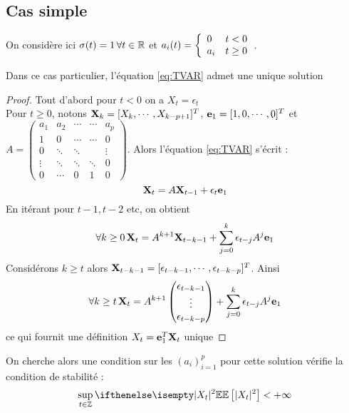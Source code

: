 \documentclass[a4paper,french]{article}
\begin{document}
\subsection{Cas simple}
On considère ici $\sigma(t)=1 \, \forall t\in \mathbb{R}$ et $a_i(t) = { \left\lbrace \begin{array}{ll} 
0 & t<0 \\
a_i & t \geq 0 \\ 
 \end{array} \right. } $. 
\begin{Prop}\label{prop:cas_simple_unicite}
Dans ce cas particulier, l'équation \eqref{eq:TVAR} admet une unique solution
\end{Prop} 
\begin{proof}
Tout d'abord pour $t < 0$ on a $X_t = \epsilon_t$ \\
Pour $t \geq 0$, notons $\mathbf{X}_k = [ X_k, \cdots , X_{k-p+1} ]^T$, $\mathbf{e}_1 = [1,0, \cdots, 0]^T$ et $A = \begin{pmatrix}
a_1 & a_2 & \cdots & \cdots & a_p \\
1 & 0 & \cdots & \cdots & 0 \\
0 & \ddots & \ddots & & \vdots \\
\vdots & \ddots & \ddots & \ddots & 0 \\
0 & \cdots & 0 & 1 & 0
\end{pmatrix}$. Alors l'équation \eqref{eq:TVAR} s'écrit : 
\[ \mathbf{X}_t = A\mathbf{X}_{t-1} + \epsilon_t \mathbf{e}_1 \]
En itérant pour $t-1, t-2$ etc, on obtient 
\[ \forall k\geq 0 \,  \mathbf{X}_t = A^{k+1} \mathbf{X}_{t-k-1} + \sum_{j=0}^k \epsilon_{t-j} A^j \mathbf{e}_1  \]
Considérons $k \geq t$ alors $\mathbf{X}_{t-k-1} = [ \epsilon_{t-k-1}, \cdots , \epsilon_{t-k-p} ]^T$. Ainsi 
\begin{equation}\label{eq:X}
\forall k\geq t \,  \mathbf{X}_t = A^{k+1} \begin{pmatrix}
\epsilon_{t-k-1} \\
\vdots \\
\epsilon_{t-k-p}\\
\end{pmatrix} 
+ \sum_{j=0}^k \epsilon_{t-j} A^j \mathbf{e}_1  
\end{equation}
ce qui fournit une définition $X_t = \mathbf{e}_1^T \mathbf{X}_t$ unique
\end{proof}

On cherche alors une condition sur les $(a_i)_{i=1}^p$ pour cette solution vérifie la condition de stabilité :
\[
\sup_{t\in \zset} \EE[|X_t|^2] < +\infty
\]
\end{document}

